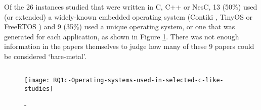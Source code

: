 \DIFdelbegin %
{%
}

\DIFdelend Of the 26 instances studied that were written in C, C++ or NesC, 13 (50\%) used (or extended) a widely-known embedded operating system (Contiki \cite{Dunkels2004}, TinyOS \cite{Levis2005} or FreeRTOS \cite{Barry2018}) and 9 (35\%) used a unique operating system, or one that was generated for each application, as shown in Figure \ref{fig:rq1c}. There was not enough information in the papers themselves to judge how many of these 9 papers could be considered ‘bare-metal’.

\DIFdelbegin \subsection{}
\addtocounter{subsection}{-1}%

\DIFdelend \begin{figure}[h]
	\DIFdelbeginFL %
\DIFdelendFL \DIFaddbeginFL \texttt{[image: RQ1c-Operating-systems-used-in-selected-c-like-studies]}
	\DIFaddendFL \caption{\DIFdelbeginFL {}\DIFdelendFL \DIFaddbeginFL {}\DIFaddendFL - \DIFdelbeginFL {}\DIFdelendFL \DIFaddbeginFL {}\DIFaddendFL }
	\DIFdelbeginFL %
{%
}
{%
}
\DIFdelendFL \DIFaddbeginFL \label{fig:rq1c}
\DIFaddendFL \end{figure}

